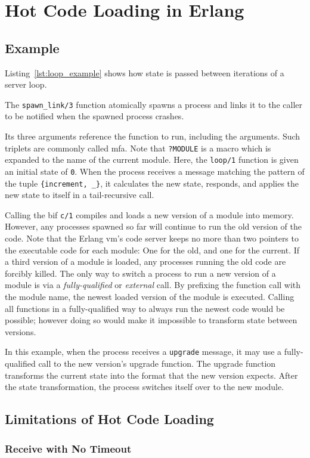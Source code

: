\chapter{Hot Code Loading in Erlang}

\section{Example}



Listing~\ref{lst:loop_example} shows how state is passed between iterations of a server loop.

The \lstinline{spawn_link/3} function atomically spawns a process and links it to the caller to be notified when the spawned process crashes.

Its three arguments reference the function to run, including the arguments. Such triplets are commonly called \acrfull{mfa}. Note that \lstinline|?MODULE| is a macro which is expanded to the name of the current module. Here, the \lstinline{loop/1} function is given an initial state of \lstinline{0}. When the process receives a message matching the pattern of the tuple \lstinline|{increment, _}|, it calculates the new state, responds, and applies the new state to itself in a tail-recursive call.

Calling the \acrfull{bif} \lstinline|c/1| compiles and loads a new version of a module into memory.
However, any processes spawned so far will continue to run the old version of the code. Note that the Erlang \acrshort{vm}'s code server keeps no more than two pointers to the executable code for each module: One for the old, and one for the current. If a third version of a module is loaded, any processes running the old code are forcibly killed. The only way to switch a process to run a new version of a module is via a \emph{fully-qualified} or \emph{external} call. By prefixing the function call with the module name, the newest loaded version of the module is executed. Calling all functions in a fully-qualified way to always run the newest code would be possible; however doing so would make it impossible to transform state between versions.

In this example, when the process receives a \lstinline{upgrade} message, it may use a fully-qualified call to the new version's upgrade function. The upgrade function transforms the current state into the format that the new version expects. After the state transformation, the process switches itself over to the new module.



\section{Limitations of Hot Code Loading}

\subsection{Receive with No Timeout}
